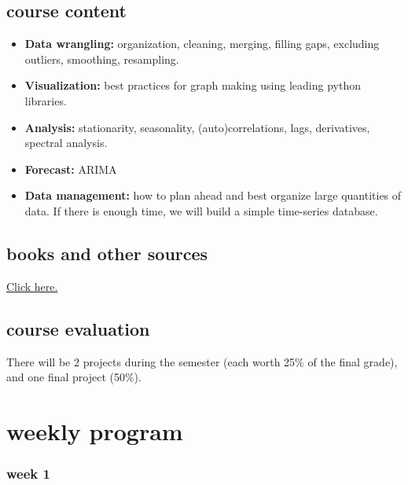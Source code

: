 \documentclass[
  letterpaper,
  DIV=11,
  numbers=noendperiod,
  oneside]{scrreprt}
\providecommand{\tightlist}{%
  \setlength{\itemsep}{0pt}\setlength{\parskip}{0pt}}\usepackage{longtable,booktabs,array}
\begin{document}
\hypertarget{course-content}{%
\subsection*{course content}\label{course-content}}

\begin{itemize}
\tightlist
\item
  \textbf{Data wrangling:} organization, cleaning, merging, filling
  gaps, excluding outliers, smoothing, resampling.
\item
  \textbf{Visualization:} best practices for graph making using leading
  python libraries.
\item
  \textbf{Analysis:} stationarity, seasonality, (auto)correlations,
  lags, derivatives, spectral analysis.
\item
  \textbf{Forecast:} ARIMA
\item
  \textbf{Data management:} how to plan ahead and best organize large
  quantities of data. If there is enough time, we will build a simple
  time-series database.
\end{itemize}

\hypertarget{books-and-other-sources}{%
\subsection*{books and other sources}\label{books-and-other-sources}}

\href{references.html}{Click here.}

\hypertarget{course-evaluation}{%
\subsection*{course evaluation}\label{course-evaluation}}

There will be 2 projects during the semester (each worth 25\% of the
final grade), and one final project (50\%).

\hypertarget{weekly-program}{%
\section*{weekly program}\label{weekly-program}}


\hypertarget{week-1}{%
\subsubsection*{week 1}\label{week-1}}
\end{document}
